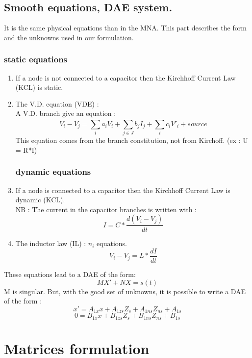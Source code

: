 \subsection{Smooth equations, DAE system.}
It is the same physical equations than in the MNA. This part describes the form and the unknowns
used in our formulation.
\subsubsection{static equations}
\begin{enumerate}
  \item If a node is not connected to a capacitor then the Kirchhoff Current Law (KCL) is static. \\
  \item The V.D. equation (VDE) : \\
    A V.D. branch give an equation :
    \[V_{i}-V_{j} = \sum_{i}^{}a_{i}V_{i} + \sum_{j\in J}^{}b_{j}I_{j} +  \sum_{i}^{}c_{i}V'_{i} +
    source\]
    This equation comes from the branch constitution, not from Kirchoff. (ex : U = R*I)
\subsubsection{dynamic equations}
  \item If a node is connected to a capacitor then the Kirchhoff Current Law is dynamic (KCL).\\
    NB : The current in the capacitor branches is written with :
    \[I = C*\frac{d(V_{i} - V_{j})}{dt}\]
  \item The inductor law (IL) : $n_{i}$ equations.
     \[V_{i} - V_{j} = L*\frac{dI}{dt}\]
\end{enumerate}

These equations lead to a DAE of the form:
\[MX'+NX=s(t)\]
M is singular. But, with the good set of unknowns, it is possible to write a DAE of the form :
\[x' = A_{1x}x +A_{1zs}Z_{s} + A_{1ns}Z_{ns}+A_{1s}\]
\[0  = B_{1x}x+B_{1zs}Z_{s} + B_{1ns}Z_{ns}+B_{1s}\]


\newpage
\section{Matrices formulation}

